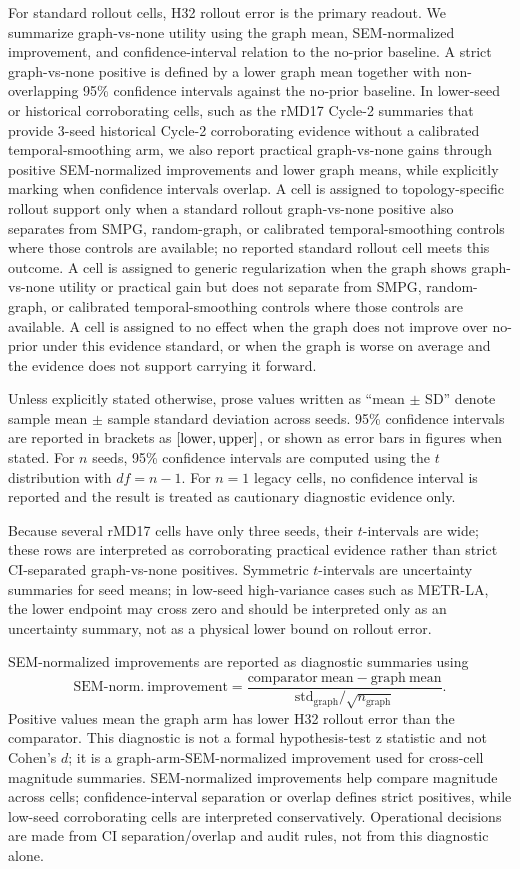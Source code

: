 \documentclass[preprint,12pt]{elsarticle}
\begin{document}
For standard rollout cells, H32 rollout error is the primary readout. We summarize graph-vs-none utility using the graph mean, SEM-normalized improvement, and confidence-interval relation to the no-prior baseline. A strict graph-vs-none positive is defined by a lower graph mean together with non-overlapping 95\% confidence intervals against the no-prior baseline. In lower-seed or historical corroborating cells, such as the rMD17 Cycle-2 summaries that provide 3-seed historical Cycle-2 corroborating evidence without a calibrated temporal-smoothing arm, we also report practical graph-vs-none gains through positive SEM-normalized improvements and lower graph means, while explicitly marking when confidence intervals overlap. A cell is assigned to topology-specific rollout support only when a standard rollout graph-vs-none positive also separates from SMPG, random-graph, or calibrated temporal-smoothing controls where those controls are available; no reported standard rollout cell meets this outcome. A cell is assigned to generic regularization when the graph shows graph-vs-none utility or practical gain but does not separate from SMPG, random-graph, or calibrated temporal-smoothing controls where those controls are available. A cell is assigned to no effect when the graph does not improve over no-prior under this evidence standard, or when the graph is worse on average and the evidence does not support carrying it forward.

Unless explicitly stated otherwise, prose values written as ``mean \(\pm\) SD'' denote sample mean \(\pm\) sample standard deviation across seeds. 95\% confidence intervals are reported in brackets as \([{\rm lower}, {\rm upper}]\), or shown as error bars in figures when stated. For \(n\) seeds, 95\% confidence intervals are computed using the \(t\) distribution with \(df=n-1\). For \(n=1\) legacy cells, no confidence interval is reported and the result is treated as cautionary diagnostic evidence only.

Because several rMD17 cells have only three seeds, their \(t\)-intervals are wide; these rows are interpreted as corroborating practical evidence rather than strict CI-separated graph-vs-none positives. Symmetric \(t\)-intervals are uncertainty summaries for seed means; in low-seed high-variance cases such as METR-LA, the lower endpoint may cross zero and should be interpreted only as an uncertainty summary, not as a physical lower bound on rollout error.

SEM-normalized improvements are reported as diagnostic summaries using
\[
\mathrm{SEM\text{-}norm.\ improvement}=\frac{\mathrm{comparator\ mean}-\mathrm{graph\ mean}}{\mathrm{std}_{\mathrm{graph}}/\sqrt{n_{\mathrm{graph}}}}.
\]
Positive values mean the graph arm has lower H32 rollout error than the comparator. This diagnostic is not a formal hypothesis-test z statistic and not Cohen's \(d\); it is a graph-arm-SEM-normalized improvement used for cross-cell magnitude summaries. SEM-normalized improvements help compare magnitude across cells; confidence-interval separation or overlap defines strict positives, while low-seed corroborating cells are interpreted conservatively. Operational decisions are made from CI separation/overlap and audit rules, not from this diagnostic alone.
\end{document}
